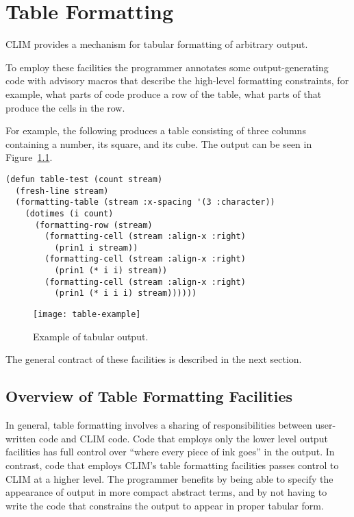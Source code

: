 
\chapter {Table Formatting}
\label {table-formatting}

CLIM provides a mechanism for tabular formatting of arbitrary output.

To employ these facilities the programmer annotates some output-generating code
with advisory macros that describe the high-level formatting constraints, for
example, what parts of code produce a row of the table, what parts of that
produce the cells in the row.

For example, the following produces a table consisting of three columns
containing a number, its square, and its cube.  The output can be seen in
Figure~\ref{table-example}.

\begin{verbatim}
(defun table-test (count stream)
  (fresh-line stream)
  (formatting-table (stream :x-spacing '(3 :character))
    (dotimes (i count)
      (formatting-row (stream)
        (formatting-cell (stream :align-x :right)
          (prin1 i stream))
        (formatting-cell (stream :align-x :right)
          (prin1 (* i i) stream))
        (formatting-cell (stream :align-x :right)
          (prin1 (* i i i) stream))))))
\end{verbatim}

\begin{figure}
\centerline{\texttt{[image: table-example]}}
\caption{\label{table-example} Example of tabular output.}
\end{figure}

The general contract of these facilities is described in the next section.


\section {Overview of Table Formatting Facilities}

In general, table formatting involves a sharing of responsibilities between
user-written code and CLIM code.  Code that employs only the lower level output
facilities has full control over ``where every piece of ink goes'' in the
output.  In contrast, code that employs CLIM's table formatting facilities
passes control to CLIM at a higher level.  The programmer benefits by being able
to specify the appearance of output in more compact abstract terms, and by not
having to write the code that constrains the output to appear in proper tabular
form.

